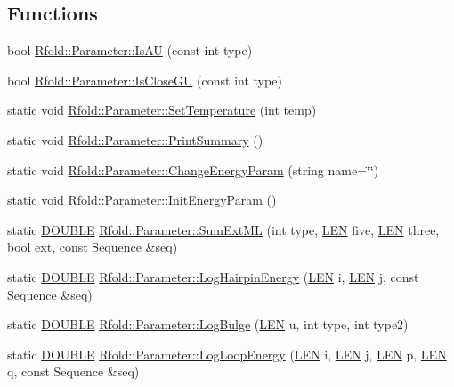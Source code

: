 \subsection*{Functions}
\begin{DoxyCompactItemize}
\item 
bool \hyperlink{namespace_rfold_1_1_parameter_a82faf0dc317bb70000edd3f34bc467b9}{Rfold\+::\+Parameter\+::\+Is\+A\+U} (const int type)
\item 
bool \hyperlink{namespace_rfold_1_1_parameter_a0ed77a73e79acb5e23fbb8f0a93e915f}{Rfold\+::\+Parameter\+::\+Is\+Close\+G\+U} (const int type)
\item 
static void \hyperlink{namespace_rfold_1_1_parameter_a308e1549312d4c50c9701331ef6acf7e}{Rfold\+::\+Parameter\+::\+Set\+Temperature} (int temp)
\item 
static void \hyperlink{namespace_rfold_1_1_parameter_af2fc6f49adcbd2c489ef4afa27c096dc}{Rfold\+::\+Parameter\+::\+Print\+Summary} ()
\item 
static void \hyperlink{namespace_rfold_1_1_parameter_a5d691fc3fd4d8c3633b25eb48ab151d0}{Rfold\+::\+Parameter\+::\+Change\+Energy\+Param} (string name=\char`\"{}\char`\"{})
\item 
static void \hyperlink{namespace_rfold_1_1_parameter_a3c977c57f1a40be353e62f7292eff9e4}{Rfold\+::\+Parameter\+::\+Init\+Energy\+Param} ()
\item 
static \hyperlink{energy__const_8hh_a8747af38b86aa2bbcda2f1b1aa0888c2}{D\+O\+U\+B\+L\+E} \hyperlink{namespace_rfold_1_1_parameter_a56e65afc08cd0ac6ec2af3a0bac07c0d}{Rfold\+::\+Parameter\+::\+Sum\+Ext\+M\+L} (int type, \hyperlink{energy__const_8hh_a05b49c662c073f89e86804f7856622a0}{L\+E\+N} five, \hyperlink{energy__const_8hh_a05b49c662c073f89e86804f7856622a0}{L\+E\+N} three, bool ext, const Sequence \&seq)
\item 
static \hyperlink{energy__const_8hh_a8747af38b86aa2bbcda2f1b1aa0888c2}{D\+O\+U\+B\+L\+E} \hyperlink{namespace_rfold_1_1_parameter_a59afd89fc8f4ec5e7fa0ef0a3e56f302}{Rfold\+::\+Parameter\+::\+Log\+Hairpin\+Energy} (\hyperlink{energy__const_8hh_a05b49c662c073f89e86804f7856622a0}{L\+E\+N} i, \hyperlink{energy__const_8hh_a05b49c662c073f89e86804f7856622a0}{L\+E\+N} j, const Sequence \&seq)
\item 
static \hyperlink{energy__const_8hh_a8747af38b86aa2bbcda2f1b1aa0888c2}{D\+O\+U\+B\+L\+E} \hyperlink{namespace_rfold_1_1_parameter_aa686da03e1df8a16f72153e7cbd8399e}{Rfold\+::\+Parameter\+::\+Log\+Bulge} (\hyperlink{energy__const_8hh_a05b49c662c073f89e86804f7856622a0}{L\+E\+N} u, int type, int type2)
\item 
static \hyperlink{energy__const_8hh_a8747af38b86aa2bbcda2f1b1aa0888c2}{D\+O\+U\+B\+L\+E} \hyperlink{namespace_rfold_1_1_parameter_a1c0e2f8427cf288a00fc615429933918}{Rfold\+::\+Parameter\+::\+Log\+Loop\+Energy} (\hyperlink{energy__const_8hh_a05b49c662c073f89e86804f7856622a0}{L\+E\+N} i, \hyperlink{energy__const_8hh_a05b49c662c073f89e86804f7856622a0}{L\+E\+N} j, \hyperlink{energy__const_8hh_a05b49c662c073f89e86804f7856622a0}{L\+E\+N} p, \hyperlink{energy__const_8hh_a05b49c662c073f89e86804f7856622a0}{L\+E\+N} q, const Sequence \&seq)
\end{DoxyCompactItemize}


